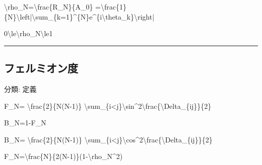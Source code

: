 \documentclass[
  a4paper]{ltjsarticle}
\newenvironment{Shaded}{}{}
\newcommand{\NormalTok}[1]{#1}
\begin{document}
\begin{Shaded}
\begin{Highlighting}[]
\NormalTok{\textbackslash{}rho\_N=\textbackslash{}frac\{R\_N\}\{A\_0\}}
\NormalTok{=\textbackslash{}frac\{1\}\{N\}\textbackslash{}left|\textbackslash{}sum\_\{k=1\}\^{}\{N\}e\^{}\{i\textbackslash{}theta\_k\}\textbackslash{}right|}
\end{Highlighting}
\end{Shaded}

\begin{Shaded}
\begin{Highlighting}[]
\NormalTok{0\textbackslash{}le\textbackslash{}rho\_N\textbackslash{}le1}
\end{Highlighting}
\end{Shaded}

\begin{center}\rule{0.5\linewidth}{0.5pt}\end{center}

\subsection{フェルミオン度}\label{ux30d5ux30a7ux30ebux30dfux30aaux30f3ux5ea6}

分類: 定義

\begin{Shaded}
\begin{Highlighting}[]
\NormalTok{F\_N=}
\NormalTok{\textbackslash{}frac\{2\}\{N(N{-}1)\}}
\NormalTok{\textbackslash{}sum\_\{i\textless{}j\}\textbackslash{}sin\^{}2\textbackslash{}frac\{\textbackslash{}Delta\_\{ij\}\}\{2\}}
\end{Highlighting}
\end{Shaded}

\begin{Shaded}
\begin{Highlighting}[]
\NormalTok{B\_N=1{-}F\_N}
\end{Highlighting}
\end{Shaded}

\begin{Shaded}
\begin{Highlighting}[]
\NormalTok{B\_N=}
\NormalTok{\textbackslash{}frac\{2\}\{N(N{-}1)\}}
\NormalTok{\textbackslash{}sum\_\{i\textless{}j\}\textbackslash{}cos\^{}2\textbackslash{}frac\{\textbackslash{}Delta\_\{ij\}\}\{2\}}
\end{Highlighting}
\end{Shaded}

\begin{Shaded}
\begin{Highlighting}[]
\NormalTok{F\_N=\textbackslash{}frac\{N\}\{2(N{-}1)\}(1{-}\textbackslash{}rho\_N\^{}2)}
\end{Highlighting}
\end{Shaded}
\end{document}
